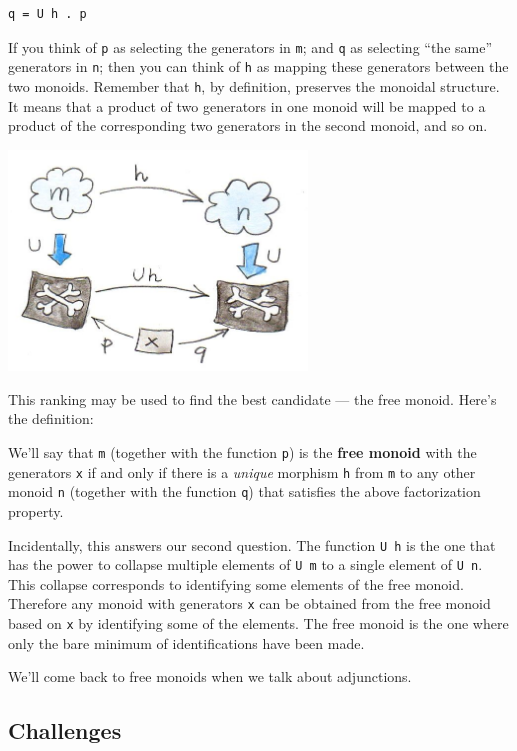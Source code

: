 \begin{verbatim}
q = U h . p
\end{verbatim}

If you think of \texttt{p} as selecting the generators in \texttt{m};
and \texttt{q} as selecting ``the same'' generators in \texttt{n}; then
you can think of \texttt{h} as mapping these generators between the two
monoids. Remember that \texttt{h}, by definition, preserves the monoidal
structure. It means that a product of two generators in one monoid will
be mapped to a product of the corresponding two generators in the second
monoid, and so on.

\includegraphics[width=3.12500in]{images/monoid-ranking.jpg}

This ranking may be used to find the best candidate --- the free monoid.
Here's the definition:

We'll say that \texttt{m} (together with the function \texttt{p}) is the
\textbf{free monoid} with the generators \texttt{x} if and only if there
is a \emph{unique} morphism \texttt{h} from \texttt{m} to any other
monoid \texttt{n} (together with the function \texttt{q}) that satisfies
the above factorization property.

Incidentally, this answers our second question. The function
\texttt{U\ h} is the one that has the power to collapse multiple
elements of \texttt{U\ m} to a single element of \texttt{U\ n}. This
collapse corresponds to identifying some elements of the free monoid.
Therefore any monoid with generators \texttt{x} can be obtained from the
free monoid based on \texttt{x} by identifying some of the elements. The
free monoid is the one where only the bare minimum of identifications
have been made.

We'll come back to free monoids when we talk about adjunctions.

\subsection{Challenges}\label{challenges}

